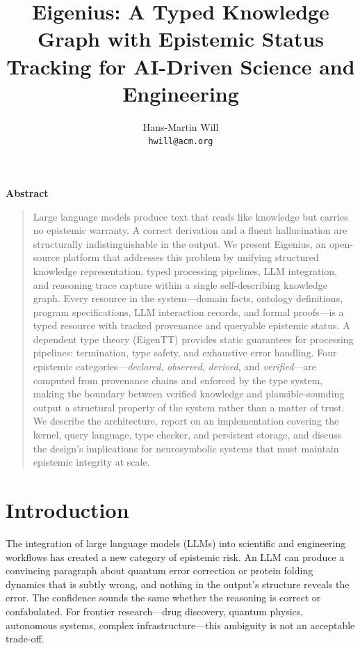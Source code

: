 \documentclass[10pt,twocolumn,letterpaper]{article}
\makeatletter
\renewcommand{\maketitle}{%
  \twocolumn[%
    \begin{center}
      {\LARGE\bfseries\@title\par}
      \vskip 1em
      {\large\@author\par}
      \vskip 0.5em
      {\normalsize\itshape\@date\par}
      \vskip 1.5em
    \end{center}
  ]%
}
\renewenvironment{abstract}{%
  \small
  \begin{center}
    \textbf{Abstract}\vspace{-0.5em}
  \end{center}
  \begin{quotation}\noindent
}{%
  \end{quotation}\vspace{0.5em}\par
}
\makeatother
\begin{document}
\title{Eigenius: A Typed Knowledge Graph with Epistemic Status\\
  Tracking for AI-Driven Science and Engineering}

\author{%
  Hans-Martin Will\\
  \texttt{hwill@acm.org}
}

\date{}

\maketitle
\thispagestyle{empty}

\begin{abstract}
Large language models produce text that reads like knowledge but carries no epistemic warranty.
A correct derivation and a fluent hallucination are structurally indistinguishable in the output.
We present Eigenius, an open-source platform that addresses this problem by unifying structured knowledge representation, typed processing pipelines, LLM integration, and reasoning trace capture within a single self-describing knowledge graph.
Every resource in the system---domain facts, ontology definitions, program specifications, LLM interaction records, and formal proofs---is a typed resource with tracked provenance and queryable epistemic status.
A dependent type theory (EigenTT) provides static guarantees for processing pipelines: termination, type safety, and exhaustive error handling.
Four epistemic categories---\emph{declared}, \emph{observed}, \emph{derived}, and \emph{verified}---are computed from provenance chains and enforced by the type system, making the boundary between verified knowledge and plausible-sounding output a structural property of the system rather than a matter of trust.
We describe the architecture, report on an implementation covering the kernel, query language, type checker, and persistent storage, and discuss the design's implications for neurosymbolic systems that must maintain epistemic integrity at scale.
\end{abstract}


\section{Introduction}
\label{sec:intro}

The integration of large language models (LLMs) into scientific and engineering workflows has created a new category of epistemic risk.
An LLM can produce a convincing paragraph about quantum error correction or protein folding dynamics that is subtly wrong, and nothing in the output's structure reveals the error.
The confidence sounds the same whether the reasoning is correct or confabulated.
For frontier research---drug discovery, quantum physics, autonomous systems, complex infrastructure---this ambiguity is not an acceptable trade-off.
\end{document}

